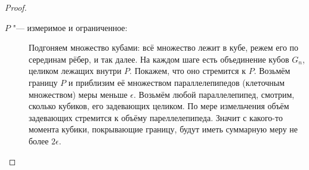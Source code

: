 \begin{proof}
\begin{description}
	\item[$P$ "--- измеримое и ограниченное:]
		Подгоняем множество кубами: всё множество лежит в кубе, режем его по серединам рёбер, и так далее.
		На каждом шаге есть объединение кубов $G_n$, целиком лежащих внутри $P$.
		Покажем, что оно стремится к $P$.
		Возьмём границу $P$ и приблизим её множеством параллелепипедов (клеточным множеством) меры меньше $\epsilon$.
		Возьмём любой параллелепипед, смотрим, сколько кубиков, его задевающих целиком.
		По мере измельчения объём задевающих стремится к объёму пареллелепипеда.
		Значит с какого-то момента кубики, покрывающие границу, будут иметь суммарную меру не более $2\epsilon$.
	\end{description}
\end{proof}